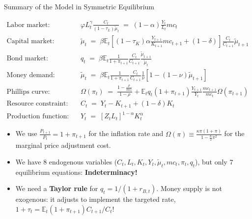\documentclass[10pt,c,aspectratio=1610,handout]{beamer}
\begin{document}
\begin{frame}{Summary of the Model in Symmetric Equilibrium}%
  \begin{small}%
    \vspace*{-0.2in}%
    \begin{align}%
      \text{Labor market:} \quad & \varphi L_t^\gamma \frac{C_t}{(1-\tau_L) \tilde{\mu}_t} \; = \; \left(1-\alpha\right) \frac{Y_t}{L_t} mc_t\\%
      \text{Capital market:} \quad & \tilde{\mu}_t \; = \; \beta \mathbb{E}_t \left[ \left(1-\tau_K\right) \alpha \frac{Y_{t+1}}{K_{t+1}} mc_{t+1} + \left(1-\delta\right) \right] \frac{C_t}{C_{t+1}} \tilde{\mu}_{t+1}\\%
      \text{Bond market:} \quad & q_t \; = \; \beta \mathbb{E}_t \frac{1}{1+\pi_{t+1}} \frac{C_t}{C_{t+1}} \frac{\tilde{\mu}_{t+1}}{\tilde{\mu}_t}\\%
      \text{Money demand:} \quad & \tilde{\mu}_t \; = \; \beta \mathbb{E}_t \frac{1}{1+\pi_{t+1}} \frac{C_t}{C_{t+1}} \frac{1}{\nu} \left[ 1 - \left(1-\nu\right) \tilde{\mu}_{t+1} \right]\\%
      \text{Phillips curve:} \quad & \Omega\left(\pi_t\right) \; = \; \frac{1-\frac{\rho}{mc_t}}{1-\rho} + \mathbb{E}_t q_t \left(1+\pi_{t+1}\right) \frac{Y_{t+1}}{Y_t} \frac{mc_{t+1}}{mc_t} \Omega\left(\pi_{t+1}\right)\\%
      \text{Resource constraint:} \quad & C_t \; = \; Y_t - K_{t+1} + (1-\delta) K_t\\%
      \text{Production function:} \quad & Y_t \; = \; \left[Z_t L_t\right]^{1-\alpha} K_t^\alpha%
    \end{align}%
    \vspace*{-0.4in}%
    \begin{itemize}
      \item[$\rightarrow$] We use $\frac{{P}_{t+1}}{{P}_t} = 1 + \pi_{t+1}$ for the inflation rate and $\Omega(\pi) \equiv \frac{\kappa \pi (1+\pi)}{1-\frac{\kappa}{2}\pi^2}$ for the marginal price adjustment cost.%
      \item[$\rightarrow$] We have $8$ endogenous variables ($C_t, L_t, K_t, Y_t, \tilde{\mu}_t, mc_t, \pi_t, q_t$), but only $7$ equilibrium equations: \textbf{Indeterminacy!}%
      \item[$\rightarrow$] We need a \textbf{Taylor rule} for $q_t = 1/(1+r_{B,t})$. Money supply is not exogenous: it adjusts to implement the targeted rate, $1+\tau_t = \mathbb{E}_t(1+\pi_{t+1})C_{t+1}/C_t$!%
    \end{itemize}
  \end{small}%
  \vspace{-0.2in}%
\end{frame}%
\end{document}

